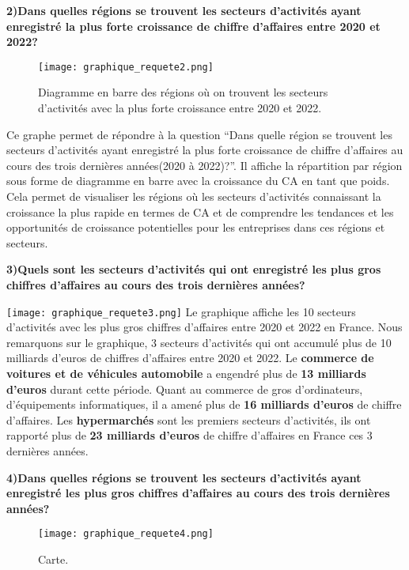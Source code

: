 \documentclass[mstat,12pt]{unswthesis}
\begin{document}
\bigskip

\textbf{2)Dans quelles régions se trouvent les secteurs d'activités
ayant enregistré la plus forte croissance de chiffre d'affaires entre
2020 et 2022?}

\medskip

\begin{figure}
\centering
\texttt{[image: graphique\_requete2.png]}
\caption{Diagramme en barre des régions où on trouvent les secteurs
d'activités avec la plus forte croissance entre 2020 et 2022.}
\end{figure}

\medskip

Ce graphe permet de répondre à la question ``Dans quelle région se
trouvent les secteurs d'activités ayant enregistré la plus forte
croissance de chiffre d'affaires au cours des trois dernières
années(2020 à 2022)?''. Il affiche la répartition par région sous forme
de diagramme en barre avec la croissance du CA en tant que poids. Cela
permet de visualiser les régions où les secteurs d'activités connaissant
la croissance la plus rapide en termes de CA et de comprendre les
tendances et les opportunités de croissance potentielles pour les
entreprises dans ces régions et secteurs.

\bigskip

\textbf{3)Quels sont les secteurs d'activités qui ont enregistré les
plus gros chiffres d'affaires au cours des trois dernières années?}
\bigskip

\texttt{[image: graphique\_requete3.png]} Le
graphique affiche les 10 secteurs d'activités avec les plus gros
chiffres d'affaires entre 2020 et 2022 en France. Nous remarquons sur le
graphique, 3 secteurs d'activités qui ont accumulé plus de 10 milliards
d'euros de chiffres d'affaires entre 2020 et 2022. Le \textbf{commerce
de voitures et de véhicules automobile} a engendré plus de \textbf{13
milliards d'euros} durant cette période. Quant au commerce de gros
d'ordinateurs, d'équipements informatiques, il a amené plus de
\textbf{16 milliards d'euros} de chiffre d'affaires. Les
\textbf{hypermarchés} sont les premiers secteurs d'activités, ils ont
rapporté plus de \textbf{23 milliards d'euros} de chiffre d'affaires en
France ces 3 dernières années.

\textbf{4)Dans quelles régions se trouvent les secteurs d'activités
ayant enregistré les plus gros chiffres d'affaires au cours des trois
dernières années? }

\begin{figure}
\centering
\texttt{[image: graphique\_requete4.png]}
\caption{Carte.}
\end{figure}
\end{document}
